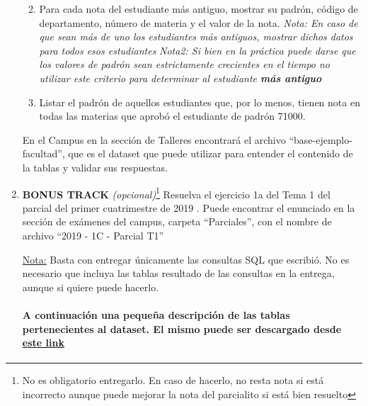 \documentclass[12pt]{amsart}
\begin{document}
\begin{enumerate}
\begin{enumerate}[label = \textit{\alph*)}]
\vspace{0.5cm}

\item Para cada nota del estudiante más antiguo, mostrar su padrón, código de departamento, número de materia y el valor de la nota.\newline
\textit{\emph{Nota:} En caso de que sean más de uno los estudiantes más antiguos, mostrar dichos datos para todos esos estudiantes}\newline
\textit{\emph{Nota2:} Si bien en la práctica puede darse que los valores de padrón sean estrictamente crecientes en el tiempo no utilizar este criterio para determinar al estudiante \textbf{más antiguo}}

\vspace{0.5cm}

\item Listar el padrón de aquellos estudiantes que, por lo menos, tienen nota en todas las materias que aprobó el estudiante de padrón 71000.

\vspace{0.5cm}
\end{enumerate}

En el Campus en la sección de Talleres encontrará el archivo ``base-ejemplo-facultad'', que es el dataset que puede utilizar para entender el contenido de la tablas y validar sus respuestas.

\vspace{0.5cm}

\item \textbf{BONUS TRACK} \textit{(opcional)}\footnote{No es obligatorio entregarlo. En caso de hacerlo, no resta nota si está incorrecto aunque puede mejorar la nota del parcialito si está bien resuelto} Resuelva el ejercicio 1a del Tema 1 del parcial del primer cuatrimestre de 2019 . Puede encontrar el enunciado en la sección de exámenes del campus, carpeta ``Parciales'', con el nombre de archivo ``2019 - 1C - Parcial T1''
\vspace{0.5cm}

{\footnotesize \underline{Nota:} Basta con entregar únicamente las consultas SQL que escribió. No es necesario que incluya las tablas resultado de las consultas en la entrega, aunque si quiere puede hacerlo. }

\newpage
{}

\vspace{1cm}
\raggedright\paragraph{A continuación una pequeña descripción de las tablas pertenecientes al dataset. El mismo puede ser descargado desde  \href{https://github.com/bdd-fiuba/paricalitos/blob/main/parcialito_4/crear_datos_notas.sql}{este link}}
\newline


\end{enumerate}
\end{document}

